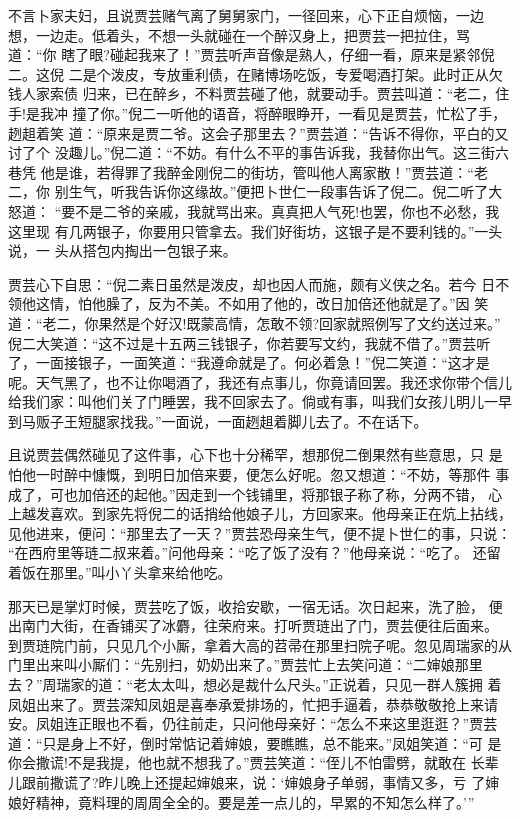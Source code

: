 不言卜家夫妇，且说贾芸赌气离了舅舅家门，一径回来，心下正自烦恼，一边
想，一边走。低着头，不想一头就碰在一个醉汉身上，把贾芸一把拉住，骂道：“你
瞎了眼?碰起我来了！”贾芸听声音像是熟人，仔细一看，原来是紧邻倪二。这倪
二是个泼皮，专放重利债，在赌博场吃饭，专爱喝酒打架。此时正从欠钱人家索债
归来，已在醉乡，不料贾芸碰了他，就要动手。贾芸叫道：“老二，住手!是我冲
撞了你。”倪二一听他的语音，将醉眼睁开，一看见是贾芸，忙松了手，趔趄着笑
道：“原来是贾二爷。这会子那里去？”贾芸道：“告诉不得你，平白的又讨了个
没趣儿。”倪二道：“不妨。有什么不平的事告诉我，我替你出气。这三街六巷凭
他是谁，若得罪了我醉金刚倪二的街坊，管叫他人离家散！”贾芸道：“老二，你
别生气，听我告诉你这缘故。”便把卜世仁一段事告诉了倪二。倪二听了大怒道：
“要不是二爷的亲戚，我就骂出来。真真把人气死!也罢，你也不必愁，我这里现
有几两银子，你要用只管拿去。我们好街坊，这银子是不要利钱的。”一头说，一
头从搭包内掏出一包银子来。

贾芸心下自思：“倪二素日虽然是泼皮，却也因人而施，颇有义侠之名。若今
日不领他这情，怕他臊了，反为不美。不如用了他的，改日加倍还他就是了。”因
笑道：“老二，你果然是个好汉!既蒙高情，怎敢不领?回家就照例写了文约送过来。”
倪二大笑道：“这不过是十五两三钱银子，你若要写文约，我就不借了。”贾芸听
了，一面接银子，一面笑道：“我遵命就是了。何必着急！”倪二笑道：“这才是
呢。天气黑了，也不让你喝酒了，我还有点事儿，你竟请回罢。我还求你带个信儿
给我们家：叫他们关了门睡罢，我不回家去了。倘或有事，叫我们女孩儿明儿一早
到马贩子王短腿家找我。”一面说，一面趔趄着脚儿去了。不在话下。

且说贾芸偶然碰见了这件事，心下也十分稀罕，想那倪二倒果然有些意思，只
是怕他一时醉中慷慨，到明日加倍来要，便怎么好呢。忽又想道：“不妨，等那件
事成了，可也加倍还的起他。”因走到一个钱铺里，将那银子称了称，分两不错，
心上越发喜欢。到家先将倪二的话捎给他娘子儿，方回家来。他母亲正在炕上拈线，
见他进来，便问：“那里去了一天？”贾芸恐母亲生气，便不提卜世仁的事，只说：
“在西府里等琏二叔来着。”问他母亲：“吃了饭了没有？”他母亲说：“吃了。
还留着饭在那里。”叫小丫头拿来给他吃。

那天已是掌灯时候，贾芸吃了饭，收拾安歇，一宿无话。次日起来，洗了脸，
便出南门大街，在香铺买了冰麝，往荣府来。打听贾琏出了门，贾芸便往后面来。
到贾琏院门前，只见几个小厮，拿着大高的苕帚在那里扫院子呢。忽见周瑞家的从
门里出来叫小厮们：“先别扫，奶奶出来了。”贾芸忙上去笑问道：“二婶娘那里
去？”周瑞家的道：“老太太叫，想必是裁什么尺头。”正说着，只见一群人簇拥
着凤姐出来了。贾芸深知凤姐是喜奉承爱排场的，忙把手逼着，恭恭敬敬抢上来请
安。凤姐连正眼也不看，仍往前走，只问他母亲好：“怎么不来这里逛逛？”贾芸
道：“只是身上不好，倒时常惦记着婶娘，要瞧瞧，总不能来。”凤姐笑道：“可
是你会撒谎!不是我提，他也就不想我了。”贾芸笑道：“侄儿不怕雷劈，就敢在
长辈儿跟前撒谎了?昨儿晚上还提起婶娘来，说：‘婶娘身子单弱，事情又多，亏
了婶娘好精神，竟料理的周周全全的。要是差一点儿的，早累的不知怎么样了。’”

